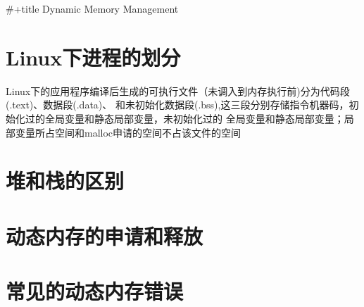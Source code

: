 \documentclass[11pt]{article}
\author{mrc20}
\date{\today}
\title{}
\begin{document}
\tableofcontents

\#+title Dynamic Memory Management
\section{Linux下进程的划分}
\label{sec:org3ddd6d9}
Linux下的应用程序编译后生成的可执行文件（未调入到内存执行前)分为代码段(.text)、数据段(.data)、
和未初始化数据段(.bss),这三段分别存储指令机器码，初始化过的全局变量和静态局部变量，未初始化过的
全局变量和静态局部变量；局部变量所占空间和malloc申请的空间不占该文件的空间
\section{堆和栈的区别}
\label{sec:org787fb1f}
\section{动态内存的申请和释放}
\label{sec:orgb30539e}
\section{常见的动态内存错误}
\label{sec:org2438242}
\end{document}
